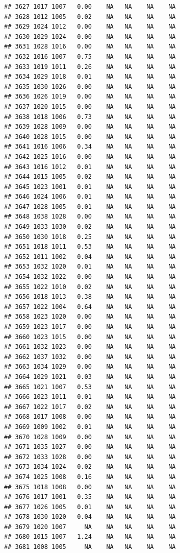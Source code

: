 \documentclass{article}\usepackage{graphicx, color}
\makeatletter
\newenvironment{kframe}{%
 \def\at@end@of@kframe{}%
 \ifinner\ifhmode%
  \def\at@end@of@kframe{\end{minipage}}%
  \begin{minipage}{\columnwidth}%
 \fi\fi%
 \def\FrameCommand##1{\hskip\@totalleftmargin \hskip-\fboxsep
 \colorbox{shadecolor}{##1}\hskip-\fboxsep
     \hskip-\linewidth \hskip-\@totalleftmargin \hskip\columnwidth}%
 \MakeFramed {\advance\hsize-\width
   \@totalleftmargin\z@ \linewidth\hsize
   \@setminipage}}%
 {\par\unskip\endMakeFramed%
 \at@end@of@kframe}
\newenvironment{knitrout}{}{} %
\makeatother
\begin{document}
\begin{knitrout}
\begin{kframe}
\begin{verbatim}
## 3627 1017 1007   0.00    NA   NA    NA    NA
## 3628 1012 1005   0.02    NA   NA    NA    NA
## 3629 1024 1012   0.00    NA   NA    NA    NA
## 3630 1029 1024   0.00    NA   NA    NA    NA
## 3631 1028 1016   0.00    NA   NA    NA    NA
## 3632 1016 1007   0.75    NA   NA    NA    NA
## 3633 1019 1011   0.26    NA   NA    NA    NA
## 3634 1029 1018   0.01    NA   NA    NA    NA
## 3635 1030 1026   0.00    NA   NA    NA    NA
## 3636 1026 1019   0.00    NA   NA    NA    NA
## 3637 1020 1015   0.00    NA   NA    NA    NA
## 3638 1018 1006   0.73    NA   NA    NA    NA
## 3639 1028 1009   0.00    NA   NA    NA    NA
## 3640 1028 1015   0.00    NA   NA    NA    NA
## 3641 1016 1006   0.34    NA   NA    NA    NA
## 3642 1025 1016   0.00    NA   NA    NA    NA
## 3643 1016 1012   0.01    NA   NA    NA    NA
## 3644 1015 1005   0.02    NA   NA    NA    NA
## 3645 1023 1001   0.01    NA   NA    NA    NA
## 3646 1024 1006   0.01    NA   NA    NA    NA
## 3647 1028 1005   0.01    NA   NA    NA    NA
## 3648 1038 1028   0.00    NA   NA    NA    NA
## 3649 1033 1030   0.02    NA   NA    NA    NA
## 3650 1030 1018   0.25    NA   NA    NA    NA
## 3651 1018 1011   0.53    NA   NA    NA    NA
## 3652 1011 1002   0.04    NA   NA    NA    NA
## 3653 1032 1020   0.01    NA   NA    NA    NA
## 3654 1032 1022   0.00    NA   NA    NA    NA
## 3655 1022 1010   0.02    NA   NA    NA    NA
## 3656 1018 1013   0.38    NA   NA    NA    NA
## 3657 1022 1004   0.64    NA   NA    NA    NA
## 3658 1023 1020   0.00    NA   NA    NA    NA
## 3659 1023 1017   0.00    NA   NA    NA    NA
## 3660 1023 1015   0.00    NA   NA    NA    NA
## 3661 1032 1023   0.00    NA   NA    NA    NA
## 3662 1037 1032   0.00    NA   NA    NA    NA
## 3663 1034 1029   0.00    NA   NA    NA    NA
## 3664 1029 1021   0.03    NA   NA    NA    NA
## 3665 1021 1007   0.53    NA   NA    NA    NA
## 3666 1023 1011   0.01    NA   NA    NA    NA
## 3667 1022 1017   0.02    NA   NA    NA    NA
## 3668 1017 1008   0.00    NA   NA    NA    NA
## 3669 1009 1002   0.01    NA   NA    NA    NA
## 3670 1028 1009   0.00    NA   NA    NA    NA
## 3671 1035 1027   0.00    NA   NA    NA    NA
## 3672 1033 1028   0.00    NA   NA    NA    NA
## 3673 1034 1024   0.02    NA   NA    NA    NA
## 3674 1025 1008   0.16    NA   NA    NA    NA
## 3675 1018 1008   0.00    NA   NA    NA    NA
## 3676 1017 1001   0.35    NA   NA    NA    NA
## 3677 1026 1005   0.01    NA   NA    NA    NA
## 3678 1030 1020   0.04    NA   NA    NA    NA
## 3679 1020 1007     NA    NA   NA    NA    NA
## 3680 1015 1007   1.24    NA   NA    NA    NA
## 3681 1008 1005     NA    NA   NA    NA    NA

\end{verbatim}
\end{kframe}
\end{knitrout}
\end{document}
